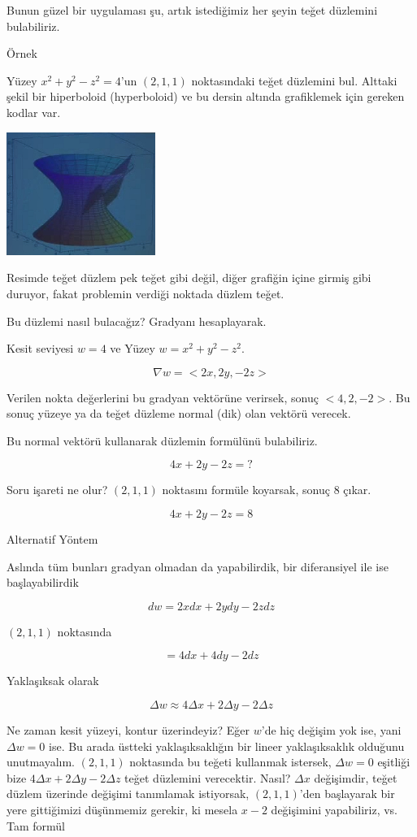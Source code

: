 \documentclass[12pt,fleqn]{article}\usepackage{../../common}
\begin{document}
Bunun güzel bir uygulaması şu, artık istediğimiz her şeyin teğet düzlemini
bulabiliriz. 

Örnek

Yüzey $x^2 + y^2 - z^2 = 4$'un $(2,1,1)$ noktasındaki teğet düzlemini
bul. Alttaki şekil bir hiperboloid (hyperboloid) ve bu dersin altında
grafiklemek için gereken kodlar var.

\begin{center}
\includegraphics[height=4cm]{12_5.png}
\end{center}

Resimde teğet düzlem pek teğet gibi değil, diğer grafiğin içine girmiş gibi
duruyor, fakat problemin verdiği noktada düzlem teğet. 

Bu düzlemi nasıl bulacağız? Gradyanı hesaplayarak. 

Kesit seviyesi $w=4$ ve Yüzey $w = x^2 + y^2 - z^2$. 

$$ \nabla w = <2x, 2y, -2z> $$

Verilen nokta değerlerini bu gradyan vektörüne verirsek, sonuç
$<4,2,-2>$. Bu sonuç yüzeye ya da teğet düzleme normal (dik) olan 
vektörü verecek. 

Bu normal vektörü kullanarak düzlemin formülünü bulabiliriz. 

$$ 4x + 2y - 2z = ? $$

Soru işareti ne olur? $(2,1,1)$ noktasını formüle koyarsak, sonuç 8 çıkar.

$$ 4x + 2y - 2z = 8 $$

Alternatif Yöntem

Aslında tüm bunları gradyan olmadan da yapabilirdik, bir diferansiyel ile
ise başlayabilirdik

$$ dw = 2x dx + 2y dy -2z dz $$

$(2,1,1)$ noktasında

$$ = 4dx + 4dy - 2dz $$

Yaklaşıksak olarak 

$$ \Delta w \approx 4 \Delta x + 2\Delta y - 2\Delta z  $$


Ne zaman kesit yüzeyi, kontur üzerindeyiz? Eğer $w$'de hiç değişim yok ise,
yani $\Delta w = 0$ ise. Bu arada üstteki yaklaşıksaklığın bir lineer
yaklaşıksaklık olduğunu unutmayalım. $(2,1,1)$ noktasında bu teğeti kullanmak 
istersek,  
$\Delta w = 0$ eşitliği bize $4 \Delta x + 2\Delta y - 2\Delta z $ teğet 
düzlemini verecektir. Nasıl? $\Delta x$ değişimdir, teğet düzlem
üzerinde değişimi tanımlamak istiyorsak, $(2,1,1)$'den başlayarak bir yere
gittiğimizi düşünmemiz gerekir, ki mesela $x-2$ değişimini yapabiliriz,
vs. Tam formül
\end{document}
